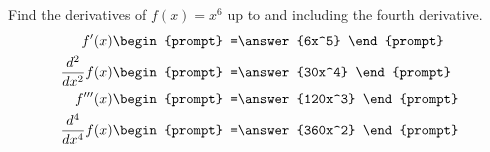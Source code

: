 \documentclass{ximera}
\author{Gregory Hartman \and Matthew Carr}
\begin{document}
\begin{exercise}




Find the derivatives of $f(x)=x^6$ up to and including the fourth derivative.
\begin{align*} 
f'(x)&
\begin{prompt}
=\answer{6x^5}
\end{prompt}\\
\frac{d^2}{dx^2}f(x)&
\begin{prompt}
=\answer{30x^4}
\end{prompt}\\
f'''(x)&
\begin{prompt}
=\answer{120x^3}
\end{prompt}\\
\frac{d^4}{dx^4}f(x)&
\begin{prompt}
=\answer{360x^2}
\end{prompt}
\end{align*}

\end{exercise}
\end{document}
